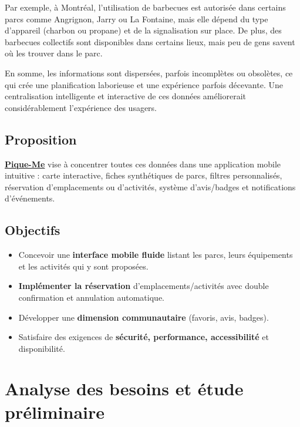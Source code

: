 \documentclass[12pt,a4paper]{article}
\begin{document}
Par exemple, à Montréal, l'utilisation de barbecues est 
autorisée dans certains parcs comme Angrignon, Jarry ou La Fontaine, mais elle dépend du type d'appareil 
(charbon ou propane) et de la signalisation sur place. De plus, des barbecues collectifs sont disponibles 
dans certains lieux, mais peu de gens savent où les trouver dans le parc.


En somme, les informations sont dispersées, parfois incomplètes ou obsolètes, ce qui crée une planification laborieuse et une expérience 
parfois décevante. Une centralisation intelligente et interactive de ces données améliorerait considérablement l'expérience des usagers.


\subsection*{Proposition}
\href{https://github.com/Abdou2111/Pique-me}{\textbf{Pique-Me}} vise à concentrer toutes ces données dans une
application mobile intuitive : carte interactive, fiches synthétiques de
parcs, filtres personnalisés, réservation d'emplacements ou d'activités,
système d'avis/badges et notifications d'événements.


\subsection*{Objectifs}
\vspace{-0.25\baselineskip}
\begin{itemize}[nosep]
  \item Concevoir une \textbf{interface mobile fluide} listant les parcs,
        leurs équipements et les activités qui y sont proposées.
  \item \textbf{Implémenter la réservation} d'emplacements/activités
        avec double confirmation et annulation automatique.
  \item Développer une \textbf{dimension communautaire} (favoris, avis,
        badges).
  \item Satisfaire des exigences de \textbf{sécurité, performance,
        accessibilité} et disponibilité.
\end{itemize}

\clearpage
\section{Analyse des besoins et étude préliminaire}
\end{document}
